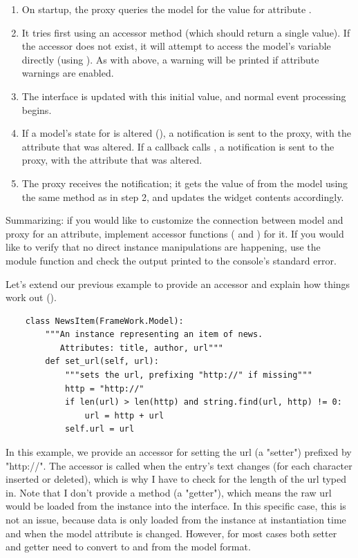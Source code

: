 \documentclass[a4paper]{howto}
\begin{document}
\begin{enumerate}
\item On startup, the proxy queries the model for the value for
attribute .
\item It tries first using an accessor method 
(which should return a single value). If the accessor does not exist, it
will attempt to access the model's variable directly (using
). As with  above, a warning will be
printed if attribute warnings are enabled.
\item The interface is updated with this initial value, and normal
event processing begins.
\item If a model's state for  is altered (), a notification is sent to the proxy, with the attribute that
was altered. If a callback calls , a notification
is sent to the proxy, with the attribute that was altered.
\item The proxy receives the notification; it gets the value of 
from the model using the same method as in step 2, and updates the
widget contents accordingly.
\end{enumerate}

Summarizing: if you would like to customize the connection between model
and proxy for an attribute, implement accessor functions
( and ) for it. If you would like to
verify that no direct instance manipulations are happening, use the
module function  and check the output
printed to the console's standard error.

Let's extend our previous example to provide an accessor and explain how
things work out ().

\begin{verbatim}
    class NewsItem(FrameWork.Model):
        """An instance representing an item of news.
           Attributes: title, author, url"""
        def set_url(self, url):
            """sets the url, prefixing "http://" if missing"""
            http = "http://"
            if len(url) > len(http) and string.find(url, http) != 0:
                url = http + url
            self.url = url
\end{verbatim}

In this example, we provide an accessor for setting the url (a "setter")
prefixed by "http://". The accessor is called when the entry's text
changes (for each character inserted or deleted), which is why I have to
check for the length of the url typed in. Note that I don't provide a
 method (a "getter"), which means the raw url would be
loaded from the instance into the interface. In this specific case, this
is not an issue, because data is only loaded from the instance at
instantiation time and when the model attribute is changed. However, for
most cases both setter and getter need to convert to and from the model
format.
\end{document}
